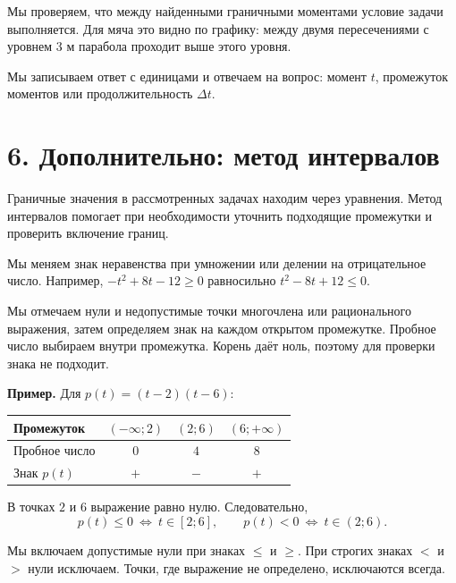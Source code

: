 \documentclass[a4paper,12pt]{article}
\newcommand{\heading}[1]{\section*{\color{darkaccent}#1}}
\newcommand{\checkitem}[1]{\par\noindent\makebox[6mm][l]{$\square$}\begin{minipage}[t]{\dimexpr\linewidth-6mm\relax}\raggedright #1\end{minipage}\par}
\begin{document}
\begin{center}
\end{center}

\checkitem{Мы проверяем, что между найденными граничными моментами условие задачи выполняется. Для мяча это видно по графику: между двумя пересечениями с уровнем $3$ м парабола проходит выше этого уровня.}
\checkitem{Мы записываем ответ с единицами и отвечаем на вопрос: момент $t$, промежуток моментов или продолжительность $\Delta t$.}

\clearpage
\heading{6. Дополнительно: метод интервалов}
Граничные значения в рассмотренных задачах находим через уравнения. Метод интервалов помогает при необходимости уточнить подходящие промежутки и проверить включение границ.

\checkitem{Мы меняем знак неравенства при умножении или делении на отрицательное число. Например, $-t^2+8t-12\ge0$ равносильно $t^2-8t+12\le0$.}
\checkitem{Мы отмечаем нули и недопустимые точки многочлена или рационального выражения, затем определяем знак на каждом открытом промежутке. Пробное число выбираем внутри промежутка. Корень даёт ноль, поэтому для проверки знака не подходит.}

\textbf{Пример.} Для $p(t)=(t-2)(t-6)$:
\begin{center}
\begin{tabular}{@{}lccc@{}}
\toprule
Промежуток & $(-\infty;2)$ & $(2;6)$ & $(6;+\infty)$ \\
\midrule
Пробное число & $0$ & $4$ & $8$ \\
Знак $p(t)$ & $+$ & $-$ & $+$ \\
\bottomrule
\end{tabular}
\end{center}
В точках $2$ и $6$ выражение равно нулю. Следовательно,
\[
p(t)\le0\ \Longleftrightarrow\ t\in[2;6],\qquad
p(t)<0\ \Longleftrightarrow\ t\in(2;6).
\]
\checkitem{Мы включаем допустимые нули при знаках $\le$ и $\ge$. При строгих знаках $<$ и $>$ нули исключаем. Точки, где выражение не определено, исключаются всегда.}
\end{document}
